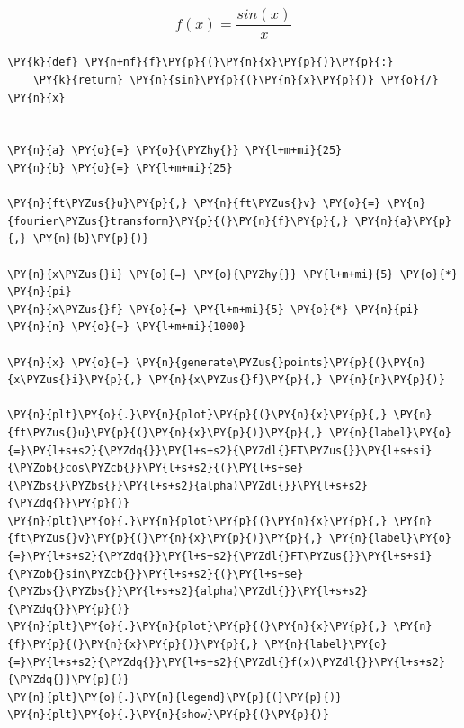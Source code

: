     \begin{center}
    \end{center}
    { \hspace*{\fill} \\}
    
    \hypertarget{fx-fracsinxx}{%
\subsubsection{\texorpdfstring{\[f(x) = \frac{sin(x)}{x}\]}{f(x) = \textbackslash frac\{sin(x)\}\{x\}}}\label{fx-fracsinxx}}

    \begin{tcolorbox}[breakable, size=fbox, boxrule=1pt, pad at break*=1mm,colback=cellbackground, colframe=cellborder]
\begin{Verbatim}[commandchars=\\\{\}]
\PY{k}{def} \PY{n+nf}{f}\PY{p}{(}\PY{n}{x}\PY{p}{)}\PY{p}{:}
    \PY{k}{return} \PY{n}{sin}\PY{p}{(}\PY{n}{x}\PY{p}{)} \PY{o}{/} \PY{n}{x}


\PY{n}{a} \PY{o}{=} \PY{o}{\PYZhy{}} \PY{l+m+mi}{25}
\PY{n}{b} \PY{o}{=} \PY{l+m+mi}{25}

\PY{n}{ft\PYZus{}u}\PY{p}{,} \PY{n}{ft\PYZus{}v} \PY{o}{=} \PY{n}{fourier\PYZus{}transform}\PY{p}{(}\PY{n}{f}\PY{p}{,} \PY{n}{a}\PY{p}{,} \PY{n}{b}\PY{p}{)}

\PY{n}{x\PYZus{}i} \PY{o}{=} \PY{o}{\PYZhy{}} \PY{l+m+mi}{5} \PY{o}{*} \PY{n}{pi}
\PY{n}{x\PYZus{}f} \PY{o}{=} \PY{l+m+mi}{5} \PY{o}{*} \PY{n}{pi}
\PY{n}{n} \PY{o}{=} \PY{l+m+mi}{1000}

\PY{n}{x} \PY{o}{=} \PY{n}{generate\PYZus{}points}\PY{p}{(}\PY{n}{x\PYZus{}i}\PY{p}{,} \PY{n}{x\PYZus{}f}\PY{p}{,} \PY{n}{n}\PY{p}{)}

\PY{n}{plt}\PY{o}{.}\PY{n}{plot}\PY{p}{(}\PY{n}{x}\PY{p}{,} \PY{n}{ft\PYZus{}u}\PY{p}{(}\PY{n}{x}\PY{p}{)}\PY{p}{,} \PY{n}{label}\PY{o}{=}\PY{l+s+s2}{\PYZdq{}}\PY{l+s+s2}{\PYZdl{}FT\PYZus{}}\PY{l+s+si}{\PYZob{}cos\PYZcb{}}\PY{l+s+s2}{(}\PY{l+s+se}{\PYZbs{}\PYZbs{}}\PY{l+s+s2}{alpha)\PYZdl{}}\PY{l+s+s2}{\PYZdq{}}\PY{p}{)}
\PY{n}{plt}\PY{o}{.}\PY{n}{plot}\PY{p}{(}\PY{n}{x}\PY{p}{,} \PY{n}{ft\PYZus{}v}\PY{p}{(}\PY{n}{x}\PY{p}{)}\PY{p}{,} \PY{n}{label}\PY{o}{=}\PY{l+s+s2}{\PYZdq{}}\PY{l+s+s2}{\PYZdl{}FT\PYZus{}}\PY{l+s+si}{\PYZob{}sin\PYZcb{}}\PY{l+s+s2}{(}\PY{l+s+se}{\PYZbs{}\PYZbs{}}\PY{l+s+s2}{alpha)\PYZdl{}}\PY{l+s+s2}{\PYZdq{}}\PY{p}{)}
\PY{n}{plt}\PY{o}{.}\PY{n}{plot}\PY{p}{(}\PY{n}{x}\PY{p}{,} \PY{n}{f}\PY{p}{(}\PY{n}{x}\PY{p}{)}\PY{p}{,} \PY{n}{label}\PY{o}{=}\PY{l+s+s2}{\PYZdq{}}\PY{l+s+s2}{\PYZdl{}f(x)\PYZdl{}}\PY{l+s+s2}{\PYZdq{}}\PY{p}{)}
\PY{n}{plt}\PY{o}{.}\PY{n}{legend}\PY{p}{(}\PY{p}{)}
\PY{n}{plt}\PY{o}{.}\PY{n}{show}\PY{p}{(}\PY{p}{)}
\end{Verbatim}
\end{tcolorbox}

